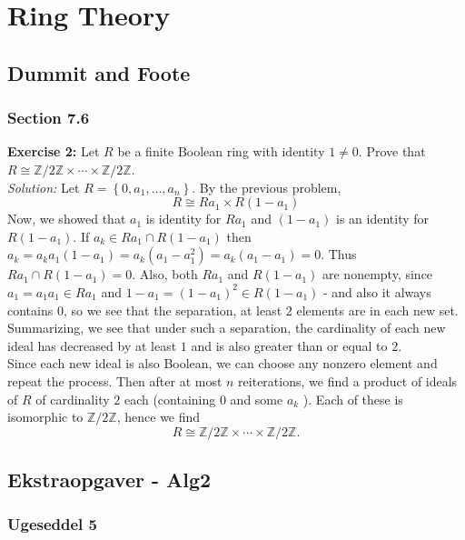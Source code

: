 \documentclass[a4paper]{article}
\begin{document}
    


\section*{Ring Theory}
\subsection*{Dummit and Foote}
\subsubsection*{Section 7.6}
\textbf{Exercise 2:} Let $R$ be a finite Boolean ring with identity $1\neq 0$. Prove
that $R \cong \mathbb{Z} / 2\mathbb{Z} \times  \cdots \times
\mathbb{Z}/2\mathbb{Z}$.\\
\linebreak
\textit{Solution:} 
Let $R = \left\{0, a_1, \ldots, a_n \right\} $. By the previous problem,
\[
R \cong Ra_1 \times R (1-a_1)
\] 
Now, we showed that $a_1$ is identity for $Ra_1$ and $(1-a_1)$ is an identity
for $R(1-a_1)$. If $a_k \in Ra_1 \cap R (1-a_1)$ then
$a_k = a_k a_1 (1-a_1) = a_k \left( a_1-a_1^2 \right) = a_k \left( a_1 -a_1 \right) 
= 0$. Thus $Ra_1 \cap R(1-a_1) = 0$. Also,
both $Ra_1$ and $R(1-a_1)$ are nonempty, since
$a_1 = a_1 a_1 \in Ra_1$ and $1-a_1 = (1-a_1)^2 \in R (1-a_1)$ - and also it
always contains $0$, so we see that the separation, at least $2$ elements are
in each new set.\\
Summarizing, we see that under such a separation, the cardinality of each new
ideal has decreased by at least $1$ and is also greater than or equal to $2$.\\
Since each new ideal is also Boolean, we can choose any nonzero element and
repeat the process. Then after at most $n$ reiterations, we find a product of
ideals of $R$ of cardinality $2$ each (containing $0$ and some $a_k$ ). Each of
these is isomorphic to $\mathbb{Z} /2\mathbb{Z}$, hence we find
 \[
R \cong \mathbb{Z} /2\mathbb{Z} \times \cdots \times \mathbb{Z} /2\mathbb{Z}.
\] 







\subsection*{Ekstraopgaver - Alg2}

\subsubsection*{Ugeseddel 5}
\end{document}
